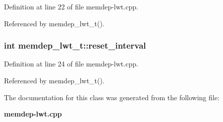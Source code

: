 Definition at line 22 of file memdep-lwt.cpp.

Referenced by memdep\_\-lwt\_\-t().
\subsubsection[{reset\_\-interval}]{\setlength{\rightskip}{0pt plus 5cm}int {\bf memdep\_\-lwt\_\-t::reset\_\-interval}\hspace{0.3cm}{\tt  [protected]}}\label{classmemdep__lwt__t_1c15d5d02e406a1daea8de430dc2f442}




Definition at line 24 of file memdep-lwt.cpp.

Referenced by memdep\_\-lwt\_\-t().

The documentation for this class was generated from the following file:\begin{CompactItemize}
\item 
{\bf memdep-lwt.cpp}\end{CompactItemize}
